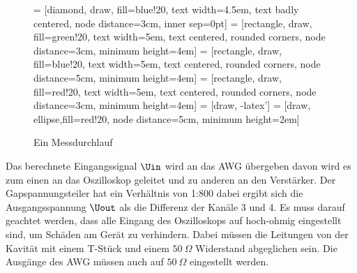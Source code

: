 \documentclass[../Report.tex]{subfiles}
\begin{document}
\begin{figure}[H]
\centering

 = [diamond, draw, fill=blue!20, 
    text width=4.5em, text badly centered, node distance=3cm, inner sep=0pt]
 = [rectangle, draw, fill=green!20, 
    text width=5em, text centered, rounded corners, node distance=3cm, minimum height=4em]
 = [rectangle, draw, fill=blue!20, 
    text width=5em, text centered, rounded corners, node distance=5cm, minimum height=4em]
 = [rectangle, draw, fill=red!20, 
    text width=5em, text centered, rounded corners, node distance=3cm, minimum height=4em]
 = [draw, -latex']
 = [draw, ellipse,fill=red!20, node distance=5cm,
    minimum height=2em]
    
\caption{Ein Messdurchlauf}
  	\label{fig:Messung}
\end{figure}
Das berechnete Eingangssignal $\Uin$ wird an das AWG übergeben davon wird es zum einen an das Oszilloskop geleitet und zu anderen an den Verstärker. Der Gapspannungsteiler hat ein Verhältnis von 1:800 dabei ergibt sich die Ausgangsspannung $\Uout$ als die Differenz der Kanäle 3 und 4. Es muss darauf geachtet werden, dass alle Eingang des Oszilloskops auf hoch-ohmig eingestellt sind, um Schäden am Gerät zu verhindern. Dabei müssen die Leitungen von der Kavität mit einem T-Stück und einem $\SI{50}{\Omega}$ Widerstand abgeglichen sein. Die Ausgänge des AWG müssen auch auf $\SI{50}{\Omega}$ eingestellt werden.
\end{document}

